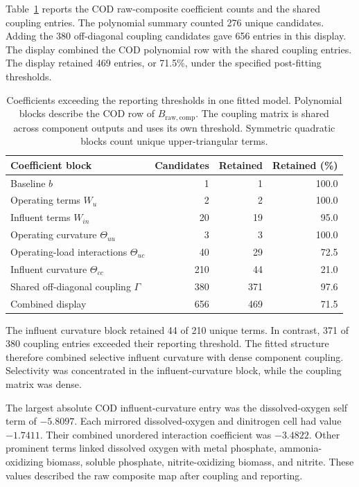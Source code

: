 Table~\ref{tab:icsor_coefficient_results} reports the COD raw-composite coefficient counts and the shared coupling entries. The polynomial summary counted 276 unique candidates. Adding the 380 off-diagonal coupling candidates gave 656 entries in this display. The display combined the COD polynomial row with the shared coupling entries. The display retained 469 entries, or 71.5\%, under the specified post-fitting thresholds.

\begin{table}[htbp]
\centering\small
\caption{Coefficients exceeding the reporting thresholds in one fitted model. Polynomial blocks describe the COD row of $B_{\mathrm{raw,comp}}$. The coupling matrix is shared across component outputs and uses its own threshold. Symmetric quadratic blocks count unique upper-triangular terms.}
\label{tab:icsor_coefficient_results}
\begin{tabular}{p{6.2cm}rrr}
\toprule
Coefficient block & Candidates & Retained & Retained (\%)\\
\midrule
Baseline $b$ & 1 & 1 & 100.0\\
Operating terms $W_u$ & 2 & 2 & 100.0\\
Influent terms $W_{in}$ & 20 & 19 & 95.0\\
Operating curvature $\Theta_{uu}$ & 3 & 3 & 100.0\\
Operating-load interactions $\Theta_{uc}$ & 40 & 29 & 72.5\\
Influent curvature $\Theta_{cc}$ & 210 & 44 & 21.0\\
Shared off-diagonal coupling $\Gamma$ & 380 & 371 & 97.6\\
Combined display & 656 & 469 & 71.5\\
\bottomrule
\end{tabular}
\end{table}

The influent curvature block retained 44 of 210 unique terms. In contrast, 371 of 380 coupling entries exceeded their reporting threshold. The fitted structure therefore combined selective influent curvature with dense component coupling. Selectivity was concentrated in the influent-curvature block, while the coupling matrix was dense.

The largest absolute COD influent-curvature entry was the dissolved-oxygen self term of $-5.8097$. Each mirrored dissolved-oxygen and dinitrogen cell had value $-1.7411$. Their combined unordered interaction coefficient was $-3.4822$. Other prominent terms linked dissolved oxygen with metal phosphate, ammonia-oxidizing biomass, soluble phosphate, nitrite-oxidizing biomass, and nitrite. These values described the raw composite map after coupling and reporting.

